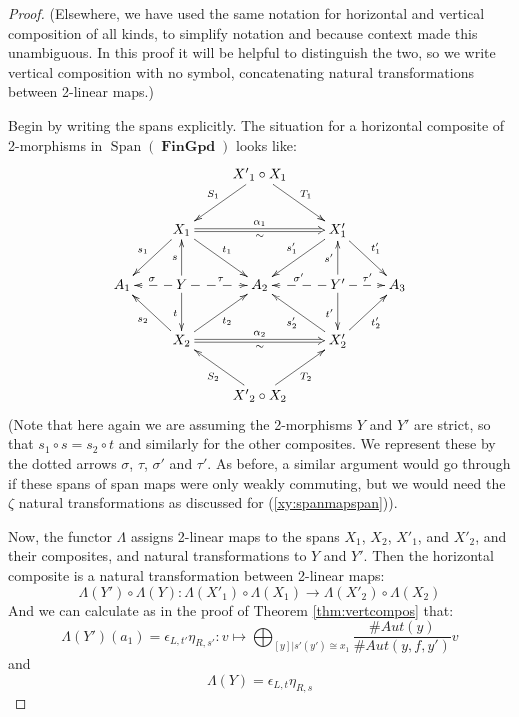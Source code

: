 \documentclass[10pt]{amsart}
\numberwithin{theorem}{subsection}
\newcommand{\ra}{\mathop{\rightarrow}}
\newcommand{\opname}[1]{\operatorname{#1}}
\newcommand{\catname}[1]{\boldsymbol{\opname{{#1}}}}
\newcommand{\Span}{\opname{Span}}
\newcommand{\Gpd}{\catname{FinGpd}}
\newcommand{\FV}{\Lambda}
\begin{document}
\begin{proof}
(Elsewhere, we have used the same notation for horizontal and vertical
  composition of all kinds, to simplify notation and because context
  made this unambiguous.  In this proof it will be helpful to
  distinguish the two, so we write vertical composition with no
  symbol, concatenating natural transformations between 2-linear
  maps.)

Begin by writing the spans explicitly.  The situation for a
horizontal composite of 2-morphisms in $\Span(\Gpd)$ looks like:
\begin{equation}\label{xy:horizontalcomposite}
\xymatrix{
 & & {X'}_1 \circ X_1 \ar[ld]_{S_1} \ar[rd]^{T_1} & & \\
 & X_1 \ar@{=>}[rr]^{\alpha_1}_{\sim} \ar[ld]_{s_1} \ar[rd]^{t_1} & & X'_1 \ar[ld]_{s'_1} \ar[rd]^{t'_1} & \\
A_1 & Y \ar[u]^{s} \ar[d]_{t} \ar@{-->}[l]_{\sigma} \ar@{-->}[r]^{\tau} & A_2 & Y' \ar[u]^{s'} \ar[d]_{t'} \ar@{-->}[l]_{\sigma '} \ar@{-->}[r]^{\tau '} & A_3 \\
 & X_2 \ar@{=>}[rr]^{\alpha_2}_{\sim} \ar[lu]^{s_2} \ar[ur]_{t_2} & & X'_2 \ar[lu]^{s'_2} \ar[ur]_{t'_2} & \\
 & & {X'}_2 \circ X_2 \ar[lu]^{S_2} \ar[ru]_{T_2} & &
}
\end{equation}
(Note that here again we are assuming the 2-morphisms $Y$ and $Y'$ are
strict, so that $s_1 \circ s = s_2 \circ t$ and similarly for the
other composites.  We represent these by the dotted arrows $\sigma$,
$\tau$, $\sigma '$ and $\tau '$.  As before, a similar argument would
go through if these spans of span maps were only weakly commuting, but
we would need the $\zeta$ natural transformations as discussed for
(\ref{xy:spanmapspan})).

Now, the functor $\FV$ assigns 2-linear maps to the spans $X_1$,
$X_2$, ${X'}_1$, and ${X'}_2$, and their composites, and natural
transformations to $Y$ and $Y'$.  Then the horizontal composite is a
natural transformation between 2-linear maps:
\begin{equation}\label{eq:horizFV}
\FV(Y') \circ \FV(Y) : \FV({X'}_1) \circ \FV(X_1) \ra \FV({X'}_2) \circ \FV(X_2)
\end{equation}
And we can calculate as in the proof of Theorem \ref{thm:vertcompos} that:
\begin{equation}
 \FV(Y')(a_1) = \epsilon_{L,t'} \eta_{R,s'} : v \mapsto \bigoplus_{[y] | s'(y')  \cong x_1}\frac{\# Aut(y)}{\# Aut(y,f,y')} v
\end{equation}
and
\begin{equation}
 \FV(Y) = \epsilon_{L,t} \eta_{R,s}
\end{equation}


\end{proof}
\end{document}
